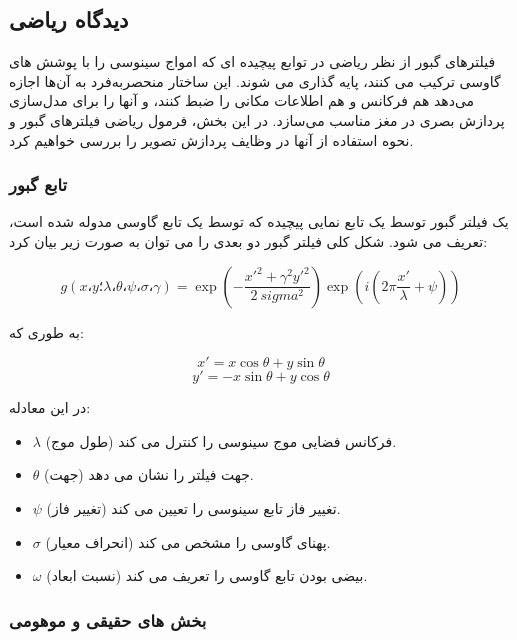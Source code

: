         \subsection{دیدگاه ریاضی}
        فیلترهای گبور از نظر ریاضی در توابع پیچیده ای که امواج سینوسی را با پوشش های گاوسی ترکیب می کنند، پایه گذاری می شوند. این ساختار منحصربه‌فرد به آن‌ها اجازه می‌دهد هم فرکانس و هم اطلاعات مکانی را ضبط کنند، و آنها را برای مدل‌سازی پردازش بصری در مغز مناسب می‌سازد. در این بخش، فرمول ریاضی فیلترهای گبور و نحوه استفاده از آنها در وظایف پردازش تصویر را بررسی خواهیم کرد.
        
            \subsubsection*{تابع گبور}
            
            یک فیلتر گبور توسط یک تابع نمایی پیچیده که توسط یک تابع گاوسی مدوله شده است، تعریف می شود. شکل کلی فیلتر گبور دو بعدی را می توان به صورت زیر بیان کرد:
            
            \[ g(x، y؛ \lambda، \theta، \psi، \sigma، \gamma) = \exp \left( -\frac{x'^2 + \gamma^2 y'^2}{2\ sigma^2} \right) \exp \left( i \left( 2\pi \frac{x'}{\lambda} + \psi \right) \right) \]
            
            به طوری که:
            
            \[ x' = x \cos \theta + y \sin \theta \]
            \[ y' = -x \sin \theta + y \cos \theta \]
            
            در این معادله:
            \begin{itemize}
                \item  $\lambda$ (طول موج) فرکانس فضایی موج سینوسی را کنترل می کند.
                    \item  $\theta$  (جهت) جهت فیلتر را نشان می دهد.
                \item  $\psi$ (تغییر فاز) تغییر فاز تابع سینوسی را تعیین می کند.
                \item  $\sigma$ (انحراف معیار) پهنای گاوسی را مشخص می کند.
                \item  $\omega$ (نسبت ابعاد) بیضی بودن تابع گاوسی را تعریف می کند.
            \end{itemize}
            
            \subsubsection*{بخش های حقیقی و موهومی}
            
